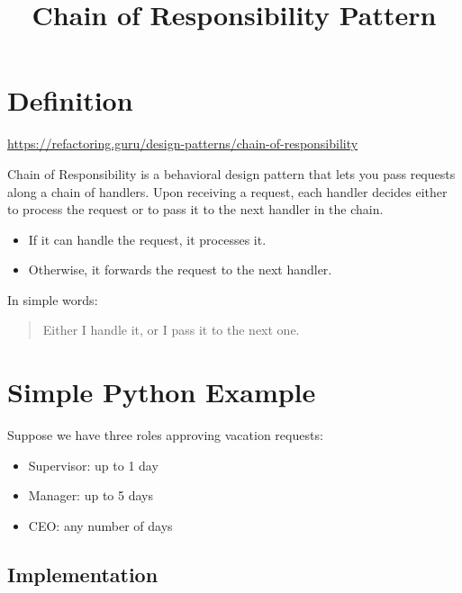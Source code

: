 \documentclass{article}
\title{Chain of Responsibility Pattern}
\begin{document}
    
    \maketitle
    
    
    \section{Definition}
        \url{https://refactoring.guru/design-patterns/chain-of-responsibility}
        
        
        Chain of Responsibility is a behavioral design pattern that lets you pass requests along a chain of handlers. Upon receiving a request, each handler decides either to process the request or to pass it to the next handler in the chain.
        
        \begin{itemize}
            \item If it can handle the request, it processes it.
            \item Otherwise, it forwards the request to the next handler.
        \end{itemize}
        
        In simple words:
        
        \begin{quote}
            Either I handle it, or I pass it to the next one.
        \end{quote}
    
    
    \section{Simple Python Example}
        
        Suppose we have three roles approving vacation requests:
        
        \begin{itemize}
            \item Supervisor: up to 1 day
            \item Manager: up to 5 days
            \item CEO: any number of days
        \end{itemize}
        
        \subsection{Implementation}
            
\end{document}
